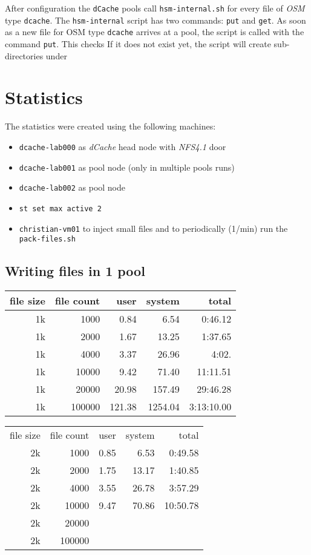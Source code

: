 \documentclass[a4paper,8pt]{scrartcl}
\begin{document}
After configuration the \texttt{dCache} pools call \texttt{hsm-internal.sh} for 
every file of \emph{OSM} type \texttt{dcache}. The \texttt{hsm-internal} script
has two commands: \texttt{put} and \texttt{get}. As soon as a new file for OSM
type \texttt{dcache} arrives at a pool, the script is called with the command 
\texttt{put}. This checks If it does not exist yet, the script will create sub-directories under 

\section{Statistics}
The statistics were created using the following machines:
\begin{itemize}
  \item \texttt{dcache-lab000} as \emph{dCache} head node with \emph{NFS4.1} door
  \item \texttt{dcache-lab001} as pool node (only in multiple pools runs)
  \item \texttt{dcache-lab002} as pool node
  \item \texttt{st set max active 2}
  \item \texttt{christian-vm01} to inject small files and to periodically (1/min) run the \texttt{pack-files.sh}
\end{itemize}

\subsection{Writing files in 1 pool}

\begin{tabular}{|r|r||r|r|r|}
  \hline
  file size & file count & user & system & total \\
  \hline
  1k & 1000 & 0.84 & 6.54 & 0:46.12 \\
  \hline
  1k & 2000 & 1.67 & 13.25 & 1:37.65 \\
  \hline
  1k & 4000 & 3.37 & 26.96 & 4:02. \\
  \hline
  1k & 10000 & 9.42 & 71.40 & 11:11.51 \\
  \hline
  1k & 20000 & 20.98 & 157.49 & 29:46.28 \\
  \hline
  1k & 100000 & 121.38 & 1254.04 & 3:13:10.00 \\
  \hline
\end{tabular}

\begin{tabular}{|r|r||r|r|r|}
  \hline
  file size & file count & user & system & total \\
         2k & 1000 & 0.85 & 6.53 & 0:49.58 \\
  \hline
  2k & 2000 & 1.75 & 13.17 & 1:40.85 \\
  \hline
  2k & 4000 & 3.55 & 26.78 & 3:57.29 \\
  \hline
  2k & 10000 & 9.47 & 70.86 & 10:50.78 \\
  \hline
  2k & 20000 & & &\\
  \hline
  2k & 100000 & & &\\
  \hline
\end{tabular}
\end{document}
